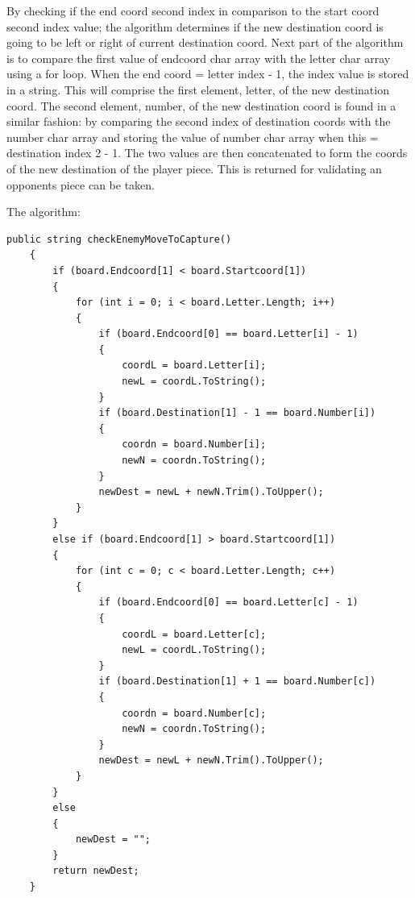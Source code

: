 \documentclass[10pt, a4paper]{article}
\begin{document}
	By checking if the end coord second index in comparison to the start coord second index value; the algorithm determines if the new destination coord is going to be left or right of current destination coord. Next part of the algorithm is to compare the first value of endcoord char array with the letter char array using a for loop. When the end coord = letter index - 1, the index value is stored in a string. This will comprise the first element, letter, of the new destination coord.
	The second element, number, of the new destination coord is found in a similar fashion: by comparing the second index of destination coords with the number char array and storing the value of number char array when this = destination index 2 - 1. The two values are then concatenated to form the coords of the new destination of the player piece. This is returned for validating an opponents piece can be taken.
	
	The algorithm:
	 \begin{lstlisting}[caption = finding new destination coord for capturing opponent piece]
	public string checkEnemyMoveToCapture()
	{
		if (board.Endcoord[1] < board.Startcoord[1])
		{
			for (int i = 0; i < board.Letter.Length; i++)
			{
				if (board.Endcoord[0] == board.Letter[i] - 1)
				{
					coordL = board.Letter[i];
					newL = coordL.ToString();
				}
				if (board.Destination[1] - 1 == board.Number[i])
				{
					coordn = board.Number[i];
					newN = coordn.ToString();    
				}
				newDest = newL + newN.Trim().ToUpper();
			}
		}
		else if (board.Endcoord[1] > board.Startcoord[1])
		{
			for (int c = 0; c < board.Letter.Length; c++)
			{
				if (board.Endcoord[0] == board.Letter[c] - 1)
				{
					coordL = board.Letter[c];
					newL = coordL.ToString();
				}
				if (board.Destination[1] + 1 == board.Number[c])
				{
					coordn = board.Number[c];
					newN = coordn.ToString();    
				}    
				newDest = newL + newN.Trim().ToUpper();
			}
		}
		else
		{
			newDest = "";
		}
		return newDest;    
	}
	\end{lstlisting}


		
\end{document}
